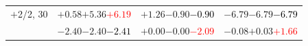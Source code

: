 \documentclass[compress]{beamer}
\begin{document}
\begin{frame}
\begin{tabular}{r | c | c | c}
$+$2/2, 30 & $+0.58$\hspace{0.1 cm}$+5.36$\hspace{0.1 cm}\textcolor{red}{$+6.19$} & $+1.26$\hspace{0.1 cm}$-0.90$\hspace{0.1 cm}\textcolor{black}{$-0.90$} & $-6.79$\hspace{0.1 cm}$-6.79$\hspace{0.1 cm}\textcolor{black}{$-6.79$} \\
           & $-2.40$\hspace{0.1 cm}$-2.40$\hspace{0.1 cm}\textcolor{black}{$-2.41$} & $+0.00$\hspace{0.1 cm}$-0.00$\hspace{0.1 cm}\textcolor{red}{$-2.09$} & $-0.08$\hspace{0.1 cm}$+0.03$\hspace{0.1 cm}\textcolor{red}{$+1.66$} \\
\end{tabular}
\end{frame}
\end{document}
